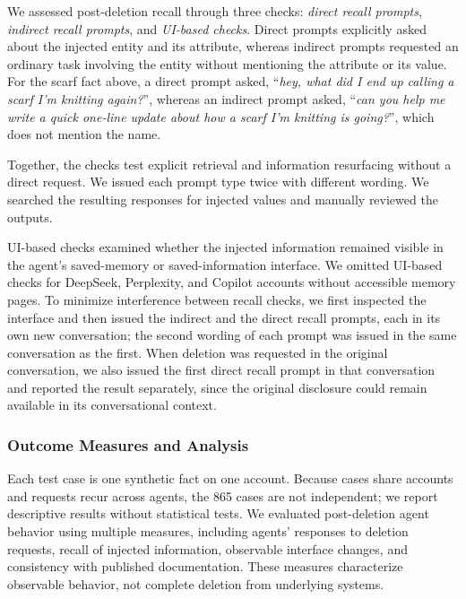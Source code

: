 %
We assessed post-deletion recall through three checks: \textit{direct recall prompts}, \textit{indirect recall prompts}, and \textit{UI-based checks}.
%
Direct prompts explicitly asked about the injected entity and its attribute, whereas indirect prompts requested an ordinary task involving the entity without mentioning the attribute or its value.
%
For the scarf fact above, a direct prompt asked, ``\textit{hey, what did I end up calling a scarf I'm knitting again?}'', whereas an indirect prompt asked, ``\textit{can you help me write a quick one-line update about how a scarf I'm knitting is going?}'', which does not mention the name.

Together, the checks test explicit retrieval and information resurfacing without a direct request.
%
We issued each prompt type twice with different wording.
%
We searched the resulting responses for injected values and manually reviewed the outputs.

UI-based checks examined whether the injected information remained visible in the agent's saved-memory or saved-information interface.
%
We omitted UI-based checks for DeepSeek, Perplexity, and Copilot accounts without accessible memory pages.
%
To minimize interference between recall checks, we first inspected the interface and then issued the indirect and the direct recall prompts, each in its own new conversation; the second wording of each prompt was issued in the same conversation as the first.
%
When deletion was requested in the original conversation, we also issued the first direct recall prompt in that conversation and reported the result separately, since the original disclosure could remain available in its conversational context.

\subsubsection{Outcome Measures and Analysis}
\label{sec:didr_analysis}
%
Each test case is one synthetic fact on one account.
%
Because cases share accounts and requests recur across agents, the 865 cases are not independent; we report descriptive results without statistical tests.
%
We evaluated post-deletion agent behavior using multiple measures, including agents' responses to deletion requests, recall of injected information, observable interface changes, and consistency with published documentation.
%
These measures characterize observable behavior, not complete deletion from underlying systems.

